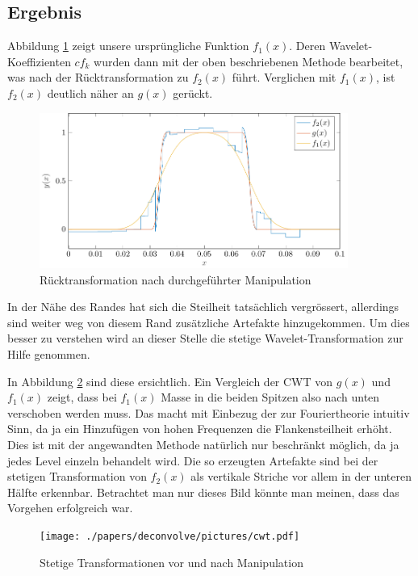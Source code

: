 \subsection{Ergebnis}
Abbildung \ref{deconvolve:result_1d} zeigt unsere ursprüngliche Funktion $f_1(x)$.
Deren Wavelet-Koeffizienten $cf_k$ wurden dann mit der oben beschriebenen Methode bearbeitet, was nach der Rücktransformation zu $f_2(x)$ führt.
Verglichen mit $f_1(x)$, ist $f_2(x)$ deutlich näher an $g(x)$ gerückt.
\begin{figure}[h]
\centering
\includegraphics[width=0.9\textwidth]{./papers/deconvolve/pictures/result_1d.pdf}
\caption{Rücktransformation nach durchgeführter Manipulation\label{deconvolve:result_1d}}
\end{figure}

In der Nähe des Randes hat sich die Steilheit tatsächlich vergrössert, allerdings sind weiter weg von diesem Rand zusätzliche Artefakte hinzugekommen.
Um dies besser zu verstehen wird an dieser Stelle die stetige Wavelet-Transformation zur Hilfe genommen.

In Abbildung \ref{deconvolve:cwt} sind diese ersichtlich.
Ein Vergleich der CWT von $g(x)$ und $f_1(x)$ zeigt, dass bei $f_1(x)$ \glqq Masse\grqq{} in die beiden Spitzen also nach unten verschoben werden muss.
Das macht mit Einbezug der zur Fouriertheorie intuitiv Sinn, da ja ein Hinzufügen von hohen Frequenzen die Flankensteilheit erhöht.
Dies ist mit der angewandten Methode natürlich nur beschränkt möglich, da ja jedes Level einzeln behandelt wird.
Die so erzeugten Artefakte sind bei der stetigen Transformation von $f_2(x)$ als vertikale Striche vor allem in der unteren Hälfte erkennbar.
Betrachtet man nur dieses Bild könnte man meinen, dass das Vorgehen erfolgreich war.

\begin{figure}[h]
\centering
\texttt{[image: ./papers/deconvolve/pictures/cwt.pdf]}
\caption{Stetige Transformationen vor und nach Manipulation\label{deconvolve:cwt}}
\end{figure}

